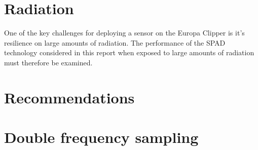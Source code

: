 \documentclass[]{report}
\begin{document}
\chapter{Radiation}\label{sec:radiation}
One of the key challenges for deploying a sensor on the Europa Clipper is it's resilience on large amounts of radiation. The performance of the SPAD technology considered in this report when exposed to large amounts of radiation must therefore be examined.



\clearpage


\clearpage



%


%


\chapter{Recommendations}\label{sec:recommendations}



\appendix
\chapter{Double frequency sampling}




{}
\end{document}
